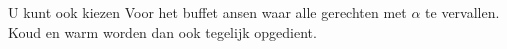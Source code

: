 U kunt ook kiezen Voor het buffet ansen waar alle gerechten met $\alpha$ te vervallen.
Koud en warm worden dan ook tegelijk opgedient.
